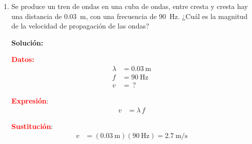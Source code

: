 \documentclass[14pt]{extarticle}
\newcommand{\textocolor}[2]{\textbf{\textcolor{#1}{#2}}}
\begin{document}
\begin{enumerate}
\item Se produce un tren de ondas en una cuba de ondas, entre cresta y cresta hay una distancia de \SI{0.03}{\meter}, con una frecuencia de \SI{90}{\hertz}. ¿Cuál es la magnitud de la velocidad de propagación de las ondas?

\textbf{Solución:}

\begin{minipage}[t]{0.35\linewidth}
\noindent
\textocolor{red}{Datos:}
\begin{align*}
\lambda &= \SI{0.03}{\meter} \\[0.5em]
f &= \SI{90}{\hertz} \\[0.5em]
v &= \, ?
\end{align*}
\end{minipage}
\hspace{1cm}
\begin{minipage}[t]{0.35\linewidth}
\noindent
\textocolor{red}{Expresión}:
\begin{align*}
v &= \lambda \, f   
\end{align*}
\end{minipage}

\begin{minipage}{0.5\linewidth}
\noindent
\textocolor{red}{Sustitución}:
\begin{align*}
v &= (\SI{0.03}{\meter})(\SI{90}{\hertz}) = \SI{2.7}{\meter\per\second}
\end{align*}
\end{minipage}
\end{enumerate}
\end{document}
